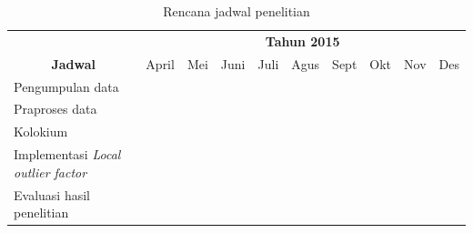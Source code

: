 \begin{table}[h!]
	\begin{center}
	\caption{Rencana jadwal penelitian}
	\label{Rencana}
	\begin{tabular}{@{}llllllllll@{}}
		\toprule
\multicolumn{1}{c}{}                               & \multicolumn{9}{c}{{\bf Tahun 2015}}                                                                                                                                                                                                             \\ \cmidrule(l){2-10} 
\multicolumn{1}{c}{\multirow{-2}{*}{{\bf Jadwal}}} & April                    & Mei                      & Juni                     & Juli                     & Agus                     & Sept                     & Okt                      & Nov                      & Des                      \\ \cmidrule(r){1-10}
		Pengumpulan data                                     & \cellcolor[HTML]{000000}   & \cellcolor[HTML]{000000} &                           &                           &                           &                           &                          &                          &                          \\
		Praproses data                                       &                            &                          & \cellcolor[HTML]{000000}  & \cellcolor[HTML]{000000}  &                           &                           &                          &                          &                          \\
		Kolokium                                             &                            &                          & \cellcolor[HTML]{000000}  &                           &                           &                           &                          &                          &                          \\
		Implementasi \textit{Local outlier factor}           &                            &                          &                           & \cellcolor[HTML]{000000}  & \cellcolor[HTML]{000000}  & \cellcolor[HTML]{000000}  & \cellcolor[HTML]{000000} & \cellcolor[HTML]{000000} &                          \\
		Evaluasi hasil penelitian                            &                            &                          &                           &                           &                           &                           &                          & \cellcolor[HTML]{000000} &                          \\

\end{tabular}
\end{center}
\end{table}
